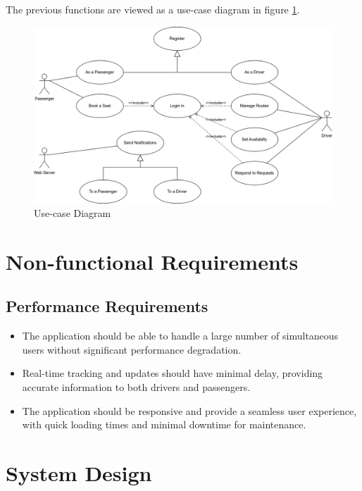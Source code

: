 \documentclass{BusMateSRS}
\begin{document}
The previous functions are viewed as a use-case diagram in
figure \ref{fig:usecase-diagram}.

\begin{figure}[h!]
	\begin{center}
		\includegraphics[width=\columnwidth]{drawings/usecase-diagram.drawio.png}
	\end{center}
	\caption{Use-case Diagram}
	\label{fig:usecase-diagram}
\end{figure}


\section{Non-functional Requirements}
\subsection{Performance Requirements}
\begin{itemize}
	\item The application should be able to handle a large number of simultaneous
	      users without significant performance degradation.
	\item Real-time tracking and updates should have minimal delay,
	      providing accurate information to both drivers and passengers.
	\item The application should be responsive and provide a seamless user
	      experience, with quick loading times and minimal downtime for maintenance.
\end{itemize}


\section{System Design}
\end{document}
